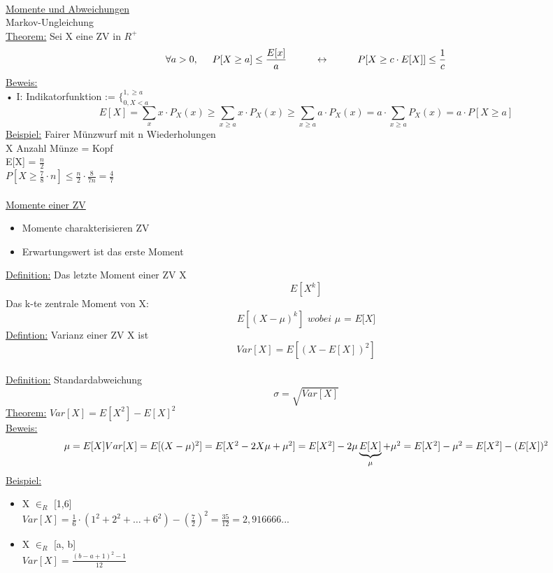 \documentclass{article}
\begin{document}
 	\hfill \\
 	\underline{Momente und Abweichungen} \\
 	Markov-Ungleichung \\
 	\underline{Theorem:} Sei X eine ZV in $R^+$ \\
 	\[
 		\forall a > 0, \hspace{0,5cm}
 		P[X \geq a] \leq \frac{E[x]}{a}
 		\hspace{1cm} \leftrightarrow \hspace{1cm} 
 		P[X \geq c \cdot E[X]] \leq \frac{1}{c}
 	\]
 	\underline{Beweis:} \\•
 	I: Indikatorfunktion := $\lbrace_{0,X<a}^{1, \geq a}$ \\
 	\[
 		E[X] = \sum_x x \cdot P_X(x) 
 		\geq \sum_{x \geq a} x \cdot P_X(x)
 		\geq \sum_{x \geq a} a \cdot P_X(x)
 		= a \cdot \sum_{x \geq a} P_X(x)
 		= a \cdot P[X \geq a]
 	\]
 	\underline{Beispiel:} Fairer Münzwurf mit n Wiederholungen \\
 	X Anzahl Münze = Kopf \\
 	E[X] = $ \frac{n}{2}$ \\
 	$P[X \geq \frac{7}{8} \cdot n] \leq \frac{n}{2} \cdot \frac{8}{7n} = \frac{4}{7}$ \\
 	\\
 	\underline{Momente einer ZV}
 	\begin{itemize}
 		\item Momente charakterisieren ZV
 		\item Erwartungswert ist das erste Moment
 	\end{itemize}
 	\underline{Definition:} Das letzte Moment einer ZV X
 	\[
 		E[X^k]
 	\] 
 	Das k-te zentrale Moment von X:
 	\[
 		E[(X-\mu)^k] \textit{ wobei $\mu$ = E[X]}
 	\]
 	\underline{Defintion:} Varianz einer ZV X ist
 	\[
 		Var[X] = E[(X-E[X])^2]
 	\]
 	\newpage
 	\hfill \\
 	\underline{Definition:} Standardabweichung
 	\[
 		\sigma = \sqrt{Var[X]}
 	\] 
 	\underline{Theorem:} $Var[X] = E[X^2]- E[X]^2$ \\
 	\underline{Beweis:}
 	\[
 		\mu = E[X] $$ $$
 		Var[X] = E[(X-\mu)^2] = E[X^2-2X\mu+\mu^2] = E[X^2]-2\mu\underbrace{E[X]}_\mu+\mu^2 = E[X^2]-\mu^2 = E[X^2]-(E[X])^2
 	\]
 	\underline{Beispiel:}
 	\begin{itemize}
		\item X $\in_R$ [1,6] \\
 		$Var[X] = \frac{1}{6} \cdot (1^2 + 2^2 + \ldots + 6^2) - (\frac{7}{2})^2 = \frac{35}{12} = 2,916666...$
 		\item X $\in_R$ [a, b] \\
 		$Var[X] = \frac{(b-a+1)^2-1}{12}$
 	\end{itemize}
\end{document}
